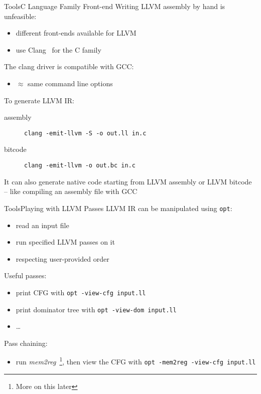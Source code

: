 \documentclass[10pt,mathserif]{beamer}
\begin{document}
\begin{frame}{Tools}{C Language Family Front-end}
Writing LLVM assembly by hand is unfeasible:

\begin{itemize}
\item different front-ends available for LLVM
\item use Clang~\cite{LOCAL:www/clang} for the C family
\end{itemize}

The clang driver is compatible with GCC:

\begin{itemize}
\item $\approx$ same command line options
\end{itemize}

To generate LLVM IR:

\begin{description}
\item[assembly] \texttt{\smaller clang -emit-llvm -S -o out.ll in.c}
\item[bitcode] \texttt{\smaller  clang -emit-llvm -o out.bc in.c}
\end{description}

It can also generate native code starting from LLVM assembly or LLVM bitcode --
like compiling an assembly file with GCC
\end{frame}

\begin{frame}{Tools}{Playing with LLVM Passes}
LLVM IR can be manipulated using \texttt{\smaller opt}:

\begin{itemize}
\item read an input file
\item run specified LLVM passes on it
\item respecting user-provided order
\end{itemize}

Useful passes:

\begin{itemize}
\item print CFG with \texttt{\smaller opt -view-cfg input.ll}
\item print dominator tree with \texttt{\smaller opt -view-dom input.ll}
\item \ldots
\end{itemize}

Pass chaining:

\begin{itemize}
\item run \emph{mem2reg}~\footnote{More on this later}, then view the CFG with
      \texttt{\smaller opt -mem2reg -view-cfg input.ll}
\end{itemize}
\end{frame}
\end{document}
